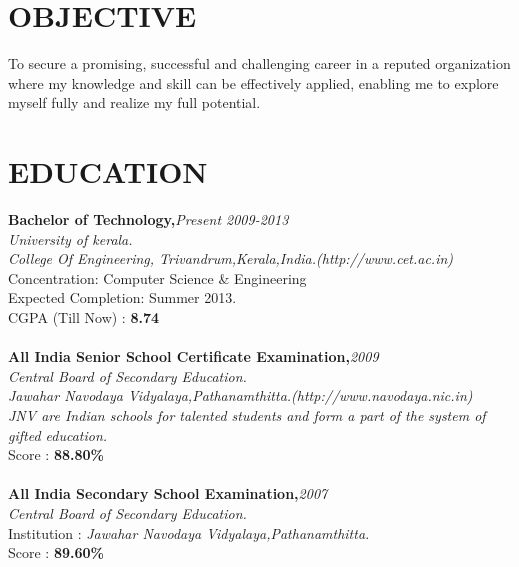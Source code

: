 \documentclass[line,margin]{res}
\begin{document}
\address{\large abilngeorge@gmail.com}
\address{\large (+91)9497359361}

\thispagestyle{empty} %

\begin{resume}
  
  \section{OBJECTIVE}       
  To secure a promising, successful and challenging career in a reputed organization where my knowledge and skill can be effectively applied, enabling me to explore myself fully and realize my full potential.\\
  
  \section{EDUCATION} 
          {\bf Bachelor of Technology,}\hfill {\it Present 2009-2013}\\
          {\it University of kerala.}\\ 
          {\it College Of Engineering, Trivandrum,Kerala,India.\hfill(http://www.cet.ac.in)} \\
          Concentration: Computer Science \& Engineering \\
          Expected Completion: Summer 2013.\\ 
          CGPA (Till Now) : {\bf 8.74} \\\\
          {\bf All India Senior School Certificate Examination,}\hfill {\it 2009}\\        
          {\it Central Board of Secondary Education.}\\
          {\it Jawahar Navodaya Vidyalaya,Pathanamthitta.}\hfill{\it(http://www.navodaya.nic.in)}\\
          {\it JNV are Indian schools for talented students and form a part of the system of gifted education.}\\
          Score       : {\bf 88.80\% } \\\\
          {\bf All India Secondary School Examination,}\hfill {\it 2007}\\
          {\it Central Board of Secondary Education.}\\
          Institution : {\it Jawahar Navodaya Vidyalaya,Pathanamthitta.} \\ 
          Score       : {\bf 89.60\% } \\

\end{resume}
\end{document}
